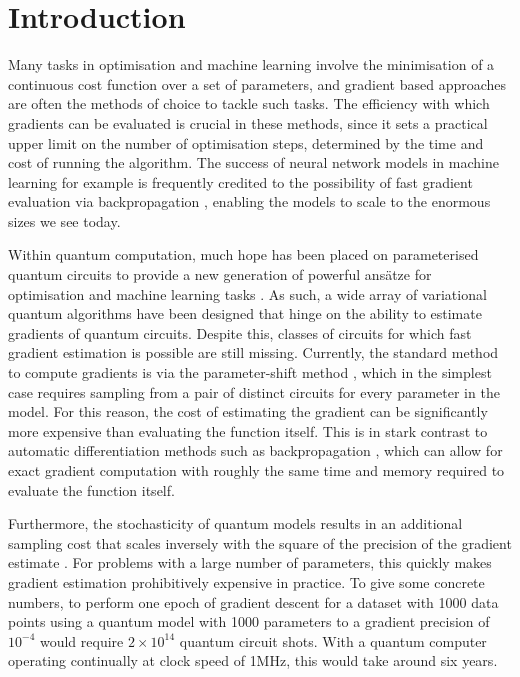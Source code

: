 \documentclass[a4paper,twocolumn,11pt]{quantumarticle}
\begin{document}
\section{Introduction}
Many tasks in optimisation and machine learning involve the minimisation of a continuous cost function over a set of parameters, and gradient based approaches are often the methods of choice to tackle such tasks. The efficiency with which gradients can be evaluated is crucial in these methods, since it sets a practical upper limit on the number of optimisation steps, determined by the time and cost of running the algorithm. The success of neural network models in machine learning for example is frequently credited to the possibility of fast gradient evaluation via backpropagation \cite{backprophinton,autodiff}, enabling the models to scale to the enormous sizes we see today. 

Within quantum computation, much hope has been placed on parameterised quantum circuits to provide a new generation of powerful ans\"atze for optimisation and machine learning tasks \cite{cerezo2021variational,benedetti2019parameterized}. As such, a wide array of variational quantum algorithms have been designed that hinge on the ability to estimate gradients of quantum circuits. Despite this, classes of circuits for which fast gradient estimation is possible are still missing. Currently, the standard method to compute gradients is via the parameter-shift method \cite{PS1,PS2,PS3,PS4}, which in the simplest case requires sampling from a pair of distinct circuits for every parameter in the model. For this reason, the cost of estimating the gradient can be significantly more expensive than evaluating the function itself. This is in stark contrast to automatic differentiation methods such as backpropagation \cite{autodiff}, which can allow for exact gradient computation with roughly the same time and memory required to evaluate the function itself.

Furthermore, the stochasticity of quantum models results in an additional sampling cost that scales inversely with the square of the precision of the gradient estimate \cite{PS2}. For problems with a large number of parameters, this quickly makes gradient estimation prohibitively expensive in practice. To give some concrete numbers, to perform one epoch of gradient descent for a dataset with 1000 data points using a quantum model with 1000 parameters to a gradient precision of $10^{-4}$ would require $2\times 10^{14}$ quantum circuit shots. With a quantum computer operating continually at clock speed of 1MHz, this would take around six years.  
\end{document}
